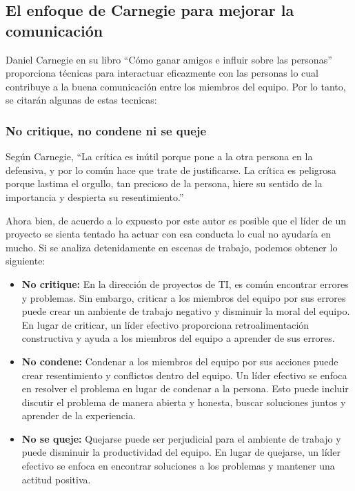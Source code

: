 \documentclass[journal]{IEEEtran}
\begin{document}
\subsection{El enfoque de Carnegie para mejorar la comunicación}
Daniel Carnegie en su libro “Cómo ganar amigos e influir sobre las personas” proporciona técnicas para interactuar eficazmente con las personas lo cual contribuye a la buena comunicación entre los miembros del equipo. Por lo tanto, se citarán algunas de estas tecnicas:

\subsubsection{No critique, no condene ni se queje}
Según Carnegie, “La crítica es inútil porque pone a la otra persona en la defensiva, y por lo común hace que trate de justificarse. La crítica es peligrosa porque lastima el orgullo, tan precioso de la persona, hiere su sentido de la importancia y despierta su resentimiento.”

Ahora bien, de acuerdo a lo expuesto por este autor es posible que el líder de un proyecto se sienta tentado ha actuar con esa conducta lo cual no ayudaría en mucho. Si se analiza detenidamente en escenas de trabajo, podemos obtener lo siguiente:

\begin{itemize}
	\item \textbf{No critique:} En la dirección de proyectos de TI, es común encontrar errores y problemas. Sin embargo, criticar a los miembros del equipo por sus errores puede crear un ambiente de trabajo negativo y disminuir la moral del equipo. En lugar de criticar, un líder efectivo proporciona retroalimentación constructiva y ayuda a los miembros del equipo a aprender de sus errores.
	\item \textbf{No condene:} Condenar a los miembros del equipo por sus acciones puede crear resentimiento y conflictos dentro del equipo. Un líder efectivo se enfoca en resolver el problema en lugar de condenar a la persona. Esto puede incluir discutir el problema de manera abierta y honesta, buscar soluciones juntos y aprender de la experiencia.
	\item \textbf{No se queje: }Quejarse puede ser perjudicial para el ambiente de trabajo y puede disminuir la productividad del equipo. En lugar de quejarse, un líder efectivo se enfoca en encontrar soluciones a los problemas y mantener una actitud positiva.
\end{itemize}
\end{document}
